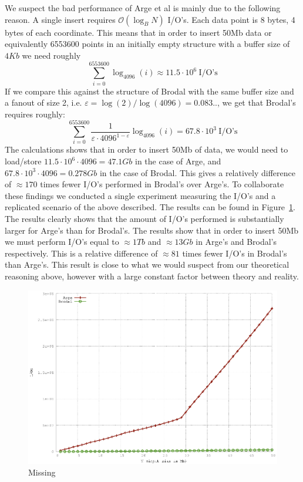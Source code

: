 \documentclass[twoside,11pt,openright]{report}
\def \epsilon {\varepsilon}
\begin{document}
We suspect the bad performance of Arge et al is mainly due to the following reason. A single insert requires $\mathcal{O}(\log_B N)$ I/O's. Each data point is 8 bytes, 4 bytes of each coordinate. This means that in order to insert 50Mb data or equivalently 6553600 points in an initially empty structure with a buffer size of $4Kb$ we need roughly $$\sum\limits_{i=0}^{6553600} \log_{4096}(i) \approx 11.5 \cdot 10^6~\text{I/O's}$$
If we compare this against the structure of Brodal with the same buffer size and a fanout of size 2, i.e. $\epsilon = \log(2)/\log(4096) = 0.083..$, we get that Brodal's requires roughly:
$$\sum\limits_{i=0}^{6553600} \frac{1}{\epsilon \cdot 4096^{1-\epsilon}} \log_{4096}(i) = 67.8\cdot 10^3~\text{I/O's}$$
The calculations shows that in order to insert 50Mb of data, we would need to load/store $11.5 \cdot 10^6 \cdot 4096 = 47.1Gb$ in the case of Arge, and $67.8\cdot 10^3 \cdot 4096 = 0.278Gb$ in the case of Brodal. This gives a relatively difference of $\approx 170$ times fewer I/O's performed in Brodal's over Arge's.
To collaborate these findings we conducted a single experiment measuring the I/O's and a replicated scenario of the above described. The results can be found in Figure~\ref{fig:arge_brodal_ios}. The results clearly shows that the amount of I/O's performed is substantially larger for Arge's than for Brodal's. The results show that in order to insert 50Mb we must perform I/O's equal to $\approx 1Tb$ and $\approx 13Gb$ in Arge's and Brodal's respectively. This is a relative difference of $\approx 81$ times fewer I/O's in Brodal's than Arge's. This result is close to what we would suspect from our theoretical reasoning above, however with a large constant factor between theory and reality.

\begin{figure}
\centering
\includegraphics[width=\textwidth]{../src/experiments/insert_experiment_results/2016-05-21.14_06_50/ios}
\caption{Missing}
\label{fig:arge_brodal_ios}
\end{figure}
\end{document}
